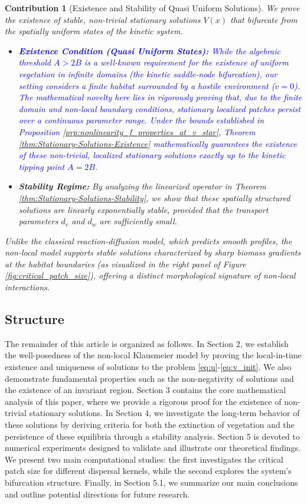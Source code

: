 \documentclass[11pt, a4paper]{article}
\theoremstyle{break}
\theoremstyle{break}
\theoremstyle{break}
\theoremstyle{break}
\theoremstyle{break}
\theoremstyle{break}
\theoremstyle{break}
\theoremstyle{break}
\theoremstyle{break}
\theoremstyle{break}
\newtheorem{main_contrib}{Contribution}
\begin{document}
\begin{main_contrib}[Existence and Stability of Quasi Uniform Solutions]
We prove the existence of stable, non-trivial stationary solutions $V(x)$ that bifurcate from the spatially uniform states of the kinetic system.
\begin{itemize}
    \item \textcolor{blue}{\textbf{Existence Condition (Quasi Uniform States):} While the algebraic threshold $A > 2B$ is a well-known requirement for the existence of uniform vegetation in infinite domains (the kinetic saddle-node bifurcation), our setting considers a finite habitat surrounded by a hostile environment ($v=0$). The mathematical novelty here lies in rigorously proving that, due to the finite domain and non-local boundary conditions, stationary localized patches persist over a continuous parameter range. Under the bounds established in Proposition \ref{prp:nonlinearity_f_properties_at_v_star}, Theorem \ref{thm:Stationary-Solutions-Existence} mathematically guarantees the existence of these non-trivial, localized stationary solutions exactly up to the kinetic tipping point $A = 2B$.}
    \item \textbf{Stability Regime:} By analyzing the linearized operator in Theorem \ref{thm:Stationary-Solutions-Stability}, we show that these spatially structured solutions are linearly exponentially stable, provided that the transport parameters $d_v$ and $d_w$ are sufficiently small.
\end{itemize}
Unlike the classical reaction-diffusion model, which predicts smooth profiles, the non-local model supports stable solutions characterized by sharp biomass gradients at the habitat boundaries (as visualized in the right panel of Figure \ref{fig:critical_patch_size}), offering a distinct morphological signature of non-local interactions.
\end{main_contrib}


\subsection{Structure}
The remainder of this article is organized as follows. 
In Section 2, we establish the well-posedness of the non-local Klausmeier model by proving the local-in-time existence and uniqueness of solutions to the problem \eqref{eq:u}-\eqref{eq:v_init}. We also demonstrate fundamental properties such as the non-negativity of solutions and the existence of an invariant region. 
Section 3 contains the core mathematical analysis of this paper, where we provide a rigorous proof for the existence of non-trivial stationary solutions. 
In Section 4, we investigate the long-term behavior of these solutions by deriving criteria for both the extinction of vegetation and the persistence of these equilibria through a stability analysis. 
Section 5 is devoted to numerical experiments designed to validate and illustrate our theoretical findings. We present two main computational studies: the first investigates the critical patch size for different dispersal kernels, while the second explores the system's bifurcation structure. 
Finally, in Section 5.1, we summarize our main conclusions and outline potential directions for future research.
\end{document}

